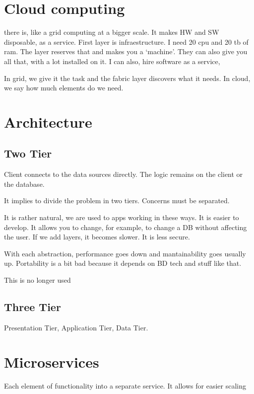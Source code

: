 \section{Cloud computing}

there is, like a grid computing at a bigger scale. It makes HW and SW disposable, as a service. First layer is infraestructure. I need 20 cpu and 20 tb of ram. The layer reserves that and makes you a `machine'. They can also give you all that, with a lot installed on it. I can also, hire software as a service,

In grid, we give it the task and the fabric layer discovers what it needs. In cloud, we say how much elements do we need.

\section{Architecture}

\subsection{Two Tier}
Client connects to the data sources directly. The logic remains on the client or the database.

It implies to divide the problem in two tiers. Concerns must be separated.

It is rather natural, we are used to apps working in these ways. It is easier to develop. It allows you to change, for example, to change a DB without affecting the user. If we add layers, it becomes slower. It is less secure.

With each abstraction, performance goes down and mantainability goes usually up. Portability is a bit bad because it depends on BD tech and stuff like that.

This is no longer used
\subsection{Three Tier}

Presentation Tier, Application Tier, Data Tier.

\section{Microservices}

Each element of functionality into a separate service. It allows for easier scaling

